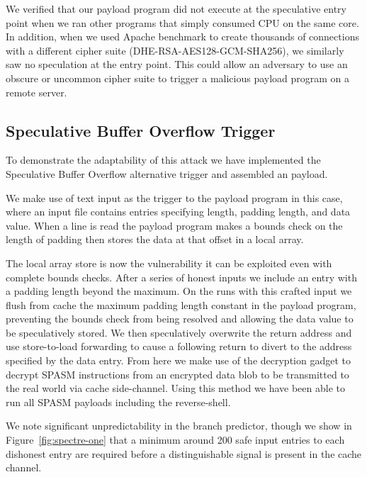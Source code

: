 We verified that our payload program did not execute at the speculative entry
point when we ran other programs that simply consumed CPU on the same core. In
addition, when we used Apache benchmark to create thousands of connections with
a different cipher suite (DHE-RSA-AES128-GCM-SHA256), we similarly saw no
speculation at the entry point. This could allow an adversary to use an obscure
or uncommon cipher suite to trigger a malicious \speculake payload program on a
remote server.



\subsection{Speculative Buffer Overflow Trigger}
\label{subsec:sbo-impl}


To demonstrate the adaptability of this attack we have implemented the 
Speculative Buffer Overflow alternative trigger and assembled an \speculake 
payload. 

We make use of text input as the trigger to the payload program in this case,
where an input file contains entries specifying length, padding length,
and data value. When a line is read the payload program makes a bounds
check on the length of padding then stores the data at that offset in a
local array. 

The local array store is now the vulnerability it can be exploited even with
complete bounds checks. After a series of honest inputs we include an entry with
a padding length beyond the maximum. On the runs with this crafted input we
flush from cache the maximum padding length constant in the payload program,
preventing the bounds check from being resolved and allowing the data value to
be speculatively stored. We then speculatively overwrite the return address and
use store-to-load forwarding to cause a following return to divert to the
address specified by the data entry. From here we make use of the decryption
gadget to decrypt SPASM instructions from an encrypted data blob to be
transmitted to the real world via cache side-channel. Using this method we have
been able to run all SPASM payloads including the reverse-shell. 

We note significant unpredictability in the branch predictor, though we
show in Figure~\ref{fig:spectre-one} that a minimum around 200 safe input entries
to each dishonest entry are required before a distinguishable signal is present 
in the cache channel. 
\fi
